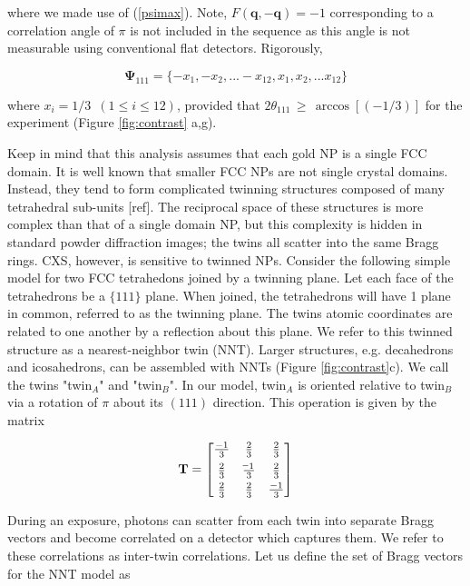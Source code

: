 \documentclass [11pt,fleqn]{article}
\newcommand*{\matminus}{%
  \leavevmode
  \hphantom{0}%
  \llap{%
    \settowidth{\dimen0 }{$0$}%
    \resizebox{1.1\dimen0 }{\height}{$-$}%
  }%
}
\def \be {\begin{equation}}
\def \ee {\end{equation}}
\begin{document}
where we made use of (\ref{psimax}). Note, $F(\bm q, -\bm q) = -1$ corresponding to a correlation angle of $\pi$ is not included in the sequence as this angle is not measurable using conventional flat detectors. Rigorously,

\be
\bm \Psi_{111} = \{ -x_1, -x_2, ... -x_{12}, x_1, x_2, ... x_{12} \}
\ee 

where $x_i = 1/3\,\,\, (1 \le i \le 12 )$, provided that $ 2\theta_{111} \, \ge \, \arccos \left[(-1/3)\right ]    $ for the experiment (Figure \ref{fig:contrast} a,g). 

Keep in mind that this analysis assumes that each gold NP is a single FCC domain. It is well known that smaller FCC NPs are not single crystal domains. Instead, they tend to form complicated twinning structures composed of many tetrahedral sub-units [ref]. The reciprocal space of these structures is more complex than that of a single domain NP, but this complexity is hidden in standard powder diffraction images; the twins all scatter into the same Bragg rings. CXS, however, is sensitive to twinned NPs. Consider the following simple model for two FCC tetrahedons joined by a twinning plane. Let each face of the tetrahedrons be a $\{111\}$ plane. When joined, the tetrahedrons will have 1 plane in common, referred to as the twinning plane. The twins atomic coordinates are related to one another by a reflection about this plane. We refer to this twinned structure as a nearest-neighbor twin (NNT). Larger structures, e.g. decahedrons and icosahedrons, can be assembled with NNTs (Figure \ref{fig:contrast}c). We call the twins "twin$_A$" and "twin$_B$".  In our model, twin$_A$ is oriented relative to twin$_B$ via a rotation of $\pi$ about its $(111)$ direction. This operation is given by the matrix

\be \label{twinmat}
\mathbf T = \begin{bmatrix}
       \frac{-1}{3} & \frac{2}{3} & \frac{2}{3}           \\[0.3em]
       \frac{2}{3} & \frac{\matminus 1}{3}           & \frac{2}{3} \\[0.3em]
       \frac{2}{3}           & \frac{2}{3} & \frac{-1}{3}
     \end{bmatrix}
\ee

During an exposure, photons can scatter from each twin into separate Bragg vectors and become correlated on a detector which captures them. We refer to these correlations as inter-twin correlations. Let us define the set of Bragg vectors for the NNT model as 
\end{document}

